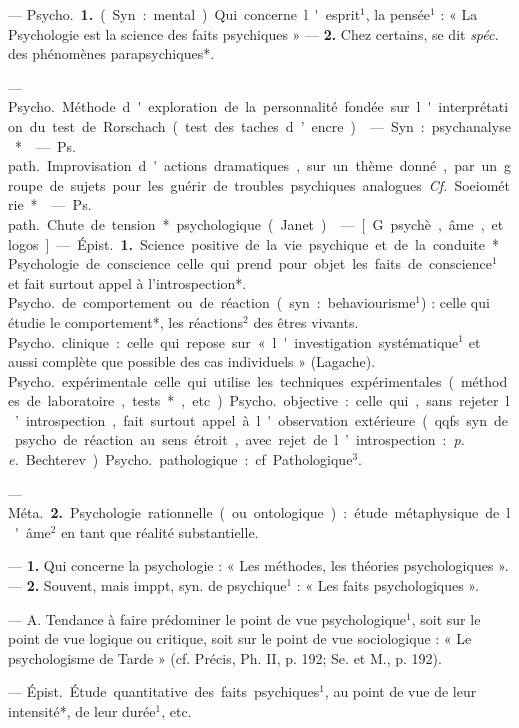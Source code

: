\begin{itemize}[leftmargin=1cm, label=, itemsep=1pt]
 — \si{Psycho.} {\bf 1.} (Syn. : mental). Qui concerne l'esprit$^1$, la
pensée$^1$ : « La Psychologie est la
science des faits psychiques » —
 {\bf 2.} Chez certains, se dit {\it spéc.} des
phénomènes parapsychiques*.

 — \si{Psycho.} Méthode
d'exploration de la personnalité
fondée sur l'interprétation du test de
Rorschach (test des taches d’encre).

 — Syn. : psychanalyse*.

 — \si{Ps. path.} Improvisation d'actions dramatiques, sur
un thème donné, par un groupe de
sujets pour les guérir de troubles
psychiques analogues. {\it Cf.} Soeiométrie*.

 — \si{Ps. path.} Chute de
tension* psychologique (Janet).

 — [G. psychè, âme, et logos]
— \si{Épist.} {\bf 1.} Science positive de la vie
psychique et de la conduite*. Psychologie de conscience celle qui
prend pour objet les faits de conscience$^1$ et fait surtout appel à l’introspection*. \si{Psycho.} de comportement ou de réaction (syn. : behaviourisme$^1$) : celle qui étudie le comportement*,
les réactions$^2$ des êtres
vivants. \si{Psycho.} clinique : celle qui
repose sur « l'investigation systématique$^1$ et aussi complète que possible des cas individuels » (Lagache).
\si{Psycho.} expérimentale celle qui
utilise les techniques expérimentales (méthodes de laboratoire,
tests*, etc.). \si{Psycho.} objective : celle
qui, sans rejeter l’introspection, fait
surtout appel à l'observation extérieure (qqfs. syn. de psycho. de réaction au sens étroit, avec rejet de l’introspection : {\it p. e.} Bechterev). \si{Psycho.}
pathologique : cf. Pathologique$^3$.

— \si{Méta.} {\bf 2.} Psychologie rationnelle (ou ontologique) : étude métaphysique de l'âme$^2$ en tant que
réalité substantielle.

 — {\bf 1.} Qui concerne la
psychologie : « Les méthodes, les
théories psychologiques ». — {\bf 2.} Souvent, mais imppt, syn. de psychique$^1$ :
« Les faits psychologiques ».

 — A. Tendance à faire
prédominer le point de vue psychologique$^1$, soit sur le point de vue
logique ou critique, soit sur le point
de vue sociologique : « Le psychologisme de Tarde » (cf. Précis, Ph. II,
p. 192; Se. et M., p. 192).

 — \si{Épist.} Étude quantitative des faits psychiques$^1$, au
point de vue de leur intensité*, de
leur durée$^1$, etc.


\end{itemize}
